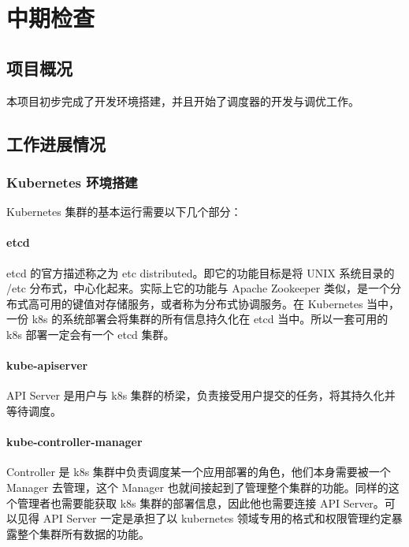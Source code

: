 \cleardoublepage
\chapter{中期检查}

\section{项目概况}

本项目初步完成了开发环境搭建，并且开始了调度器的开发与调优工作。

\section{工作进展情况}

\subsection{Kubernetes 环境搭建}

Kubernetes 集群的基本运行需要以下几个部分：

\subsubsection*{etcd}

etcd 的官方描述称之为 etc distributed。即它的功能目标是将 UNIX 系统目录的 /etc 分布式，中心化起来。实际上它的功能与 Apache Zookeeper 类似，是一个分布式高可用的键值对存储服务，或者称为分布式协调服务。在 Kubernetes 当中，一份 k8s 的系统部署会将集群的所有信息持久化在 etcd 当中。所以一套可用的 k8s 部署一定会有一个 etcd 集群。

\subsubsection*{kube-apiserver}

API Server 是用户与 k8s 集群的桥梁，负责接受用户提交的任务，将其持久化并等待调度。

\subsubsection*{kube-controller-manager}

Controller 是 k8s 集群中负责调度某一个应用部署的角色，他们本身需要被一个 Manager 去管理，这个 Manager 也就间接起到了管理整个集群的功能。同样的这个管理者也需要能获取 k8s 集群的部署信息，因此他也需要连接 API Server。可以见得 API Server 一定是承担了以 kubernetes 领域专用的格式和权限管理约定暴露整个集群所有数据的功能。

